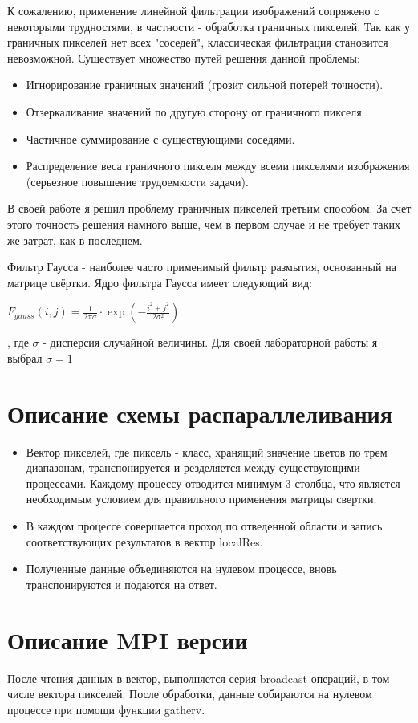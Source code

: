 \documentclass[a4paper,14pt]{report}
\begin{document}
К сожалению, применение линейной фильтрации изображений сопряжено с некоторыми трудностями, в частности - обработка граничных пикселей. Так как у граничных пикселей нет всех "соседей", классическая фильтрация становится невозможной. Существует множество путей решения данной проблемы:
\begin{itemize}
    \item Игнорирование граничных значений (грозит сильной потерей точности).
    \item Отзеркаливание значений по другую сторону от граничного пикселя.
    \item Частичное суммирование с существующими соседями.
    \item Распределение веса граничного пикселя между всеми пикселями изображения (серьезное повышение трудоемкости задачи).
\end{itemize}

В своей работе я решил проблему граничных пикселей третьим способом. За счет этого точность решения намного выше, чем в первом случае и не требует таких же затрат, как в последнем.

Фильтр Гаусса - наиболее часто применимый фильтр размытия, основанный на матрице свёртки. Ядро фильтра Гаусса имеет следующий вид:
\begin{center}
    $F_{gauss}(i, j) = \frac{1}{2\pi \sigma} \cdot \exp{(-\frac{i^2 + j^2}{2\sigma^2})}$
\end{center}
, где $\sigma$ - дисперсия случайной величины. Для своей лабораторной работы я выбрал $\sigma = 1$ 

\section{Описание схемы распараллеливания}
\begin{itemize}
    \item Вектор пикселей, где пиксель - класс, хранящий значение цветов по трем диапазонам, транспонируется и резделяется между существующими процессами. Каждому процессу отводится минимум 3 столбца, что является необходимым условием для правильного применения матрицы свертки.
    \item В каждом процессе совершается проход по отведенной области и запись соответствующих результатов в вектор localRes.
    \item Полученные данные объединяются на нулевом процессе, вновь транспонируются и подаются на ответ. 
\end{itemize}
\section{Описание MPI версии}
После чтения данных в вектор, выполняется серия broadcast операций, в том числе вектора пикселей. После обработки, данные собираются на нулевом процессе при помощи функции gatherv.
\newpage
\end{document}
